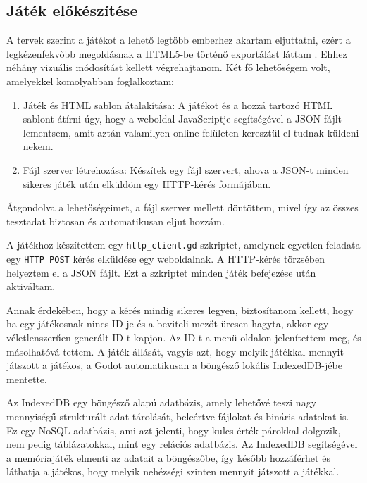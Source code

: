 \subsection{Játék előkészítése}
A tervek szerint a játékot a lehető legtöbb emberhez akartam eljuttatni, ezért a legkézenfekvőbb megoldásnak a HTML5-be történő exportálást láttam \cite{Exportin97:online}. Ehhez néhány vizuális módosítást kellett végrehajtanom.
Két fő lehetőségem volt, amelyekkel komolyabban foglalkoztam:
\begin{enumerate}
    \item  Játék és HTML sablon átalakítása: A játékot és a hozzá tartozó HTML sablont átírni úgy, hogy a weboldal JavaScriptje segítségével a JSON fájlt lementsem, amit aztán valamilyen online felületen keresztül el tudnak küldeni nekem.
    \item	Fájl szerver létrehozása: Készítek egy fájl szervert, ahova a JSON-t minden sikeres játék után elküldöm egy HTTP-kérés formájában.

\end{enumerate}


Átgondolva a lehetőségeimet, a fájl szerver mellett döntöttem, mivel így az összes tesztadat biztosan és automatikusan eljut hozzám.

A játékhoz készítettem egy \lstinline{http_client.gd} szkriptet, amelynek egyetlen feladata egy \lstinline{HTTP POST} kérés elküldése egy weboldalnak. A HTTP-kérés törzsében helyeztem el a JSON fájlt. Ezt a szkriptet minden játék befejezése után aktiváltam.

Annak érdekében, hogy a kérés mindig sikeres legyen, biztosítanom kellett, 
hogy ha egy játékosnak nincs ID-je és a beviteli mezőt üresen hagyta, akkor egy véletlenszerűen generált ID-t kapjon. 
Az ID-t a menü oldalon jelenítettem meg, és másolhatóvá tettem.
A játék állását, vagyis azt, hogy melyik játékkal mennyit játszott a játékos, a Godot automatikusan a böngésző lokális IndexedDB-jébe \cite{Exportin97:online} mentette.

Az IndexedDB \cite{UsingInd44:online} egy böngésző alapú adatbázis, amely lehetővé teszi nagy mennyiségű strukturált adat tárolását, beleértve fájlokat és bináris adatokat is. Ez egy NoSQL adatbázis, ami azt jelenti, hogy kulcs-érték párokkal dolgozik, nem pedig táblázatokkal, mint egy relációs adatbázis. 
Az IndexedDB segítségével a memóriajáték elmenti az adatait a böngészőbe, így később hozzáférhet és láthatja a játékos, hogy melyik nehézségi szinten mennyit játszott a játékkal.

